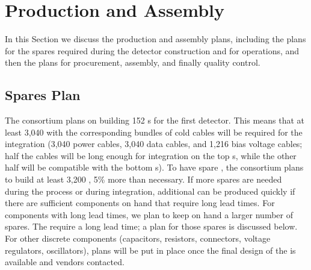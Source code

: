 \section{Production and Assembly}
\label{sec:fdsp-tpcelec-production}

In this Section we discuss the production and assembly plans,
including the plans for the spares required during the detector
construction and for operations, and then the plans for
procurement, assembly, and finally quality control.


\subsection{Spares Plan}
\label{sec:fdsp-tpcelec-production-spares}

The  consortium plans on building 152 s
for the first  detector. This means that at least
3,040  with the corresponding bundles of cold
cables will be required for the integration (3,040 power cables, 3,040 data cables,
and 1,216 bias voltage cables; half the cables will be long enough for 
integration on the top s, while the other half will
be compatible with the bottom s). To have spare , the  consortium plans to
build at least 3,200 , 5\% more than necessary. If more spares are needed during the
 process or during integration, additional 
 can be produced quickly if there are sufficient components on hand
that require long lead times. For components with long lead times, we plan to keep on hand a
larger number of spares. The  require a long lead time; a plan for those spares is
discussed below. For other discrete components
(capacitors, resistors, connectors, voltage regulators, oscillators),
plans will be put in place once the final design of the 
is available and vendors contacted. %

